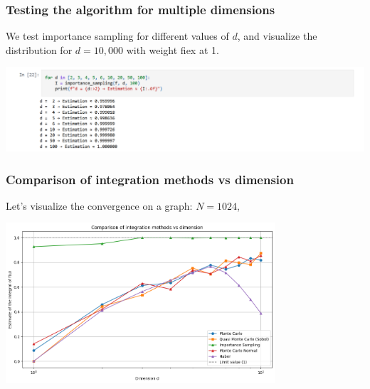 \documentclass[aspectratio=169,xcolor=dvipsnames]{beamer}
\begin{document}
    \begin{frame}
    \frametitle{Testing the algorithm for multiple dimensions}
        We test importance sampling for different values of \( d \), and visualize the distribution for \( d = 10,000 \) with weight fiex at 1.

        \begin{center}
            \includegraphics[width=1\textwidth]{projet_mc_output_d.png}
        \end{center}
    \end{frame}

    


    \begin{frame}
    \frametitle{Comparison of integration methods vs dimension}
        Let's visualize the convergence on a graph: $N = 1024$,
    
        \begin{center}
        \includegraphics[width=0.75\textwidth]{output_compariaons mc.png}
        \end{center}
   

    \end{frame}



    
  
\end{document}
